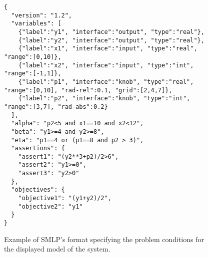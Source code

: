 \documentclass[a4paper,parskip=half]{article} %
\begin{document}
\begin{figure}%
\small
\begin{verbatim}
{
  "version": "1.2",
  "variables": [
    {"label":"y1", "interface":"output", "type":"real"},
    {"label":"y2", "interface":"output", "type":"real"},
    {"label":"x1", "interface":"input", "type":"real", "range":[0,10]},
    {"label":"x2", "interface":"input", "type":"int", "range":[-1,1]},
    {"label":"p1", "interface":"knob", "type":"real", "range":[0,10], "rad-rel":0.1, "grid":[2,4,7]},
    {"label":"p2", "interface":"knob", "type":"int", "range":[3,7], "rad-abs":0.2}
  ],
  "alpha": "p2<5 and x1==10 and x2<12",
  "beta": "y1>=4 and y2>=8",
  "eta": "p1==4 or (p1==8 and p2 > 3)",
  "assertions": {
    "assert1": "(y2**3+p2)/2>6",
    "assert2": "y1>=0",
    "assert3": "y2>0"
  },
  "objectives": {
    "objective1": "(y1+y2)/2",
    "objective2": "y1"
  }
}
\end{verbatim}
\vspace*{-1\baselineskip}
\caption{Example of SMLP's format specifying the problem conditions for the displayed model of the system.}
\label{fig:spec}
\end{figure}
\end{document}
